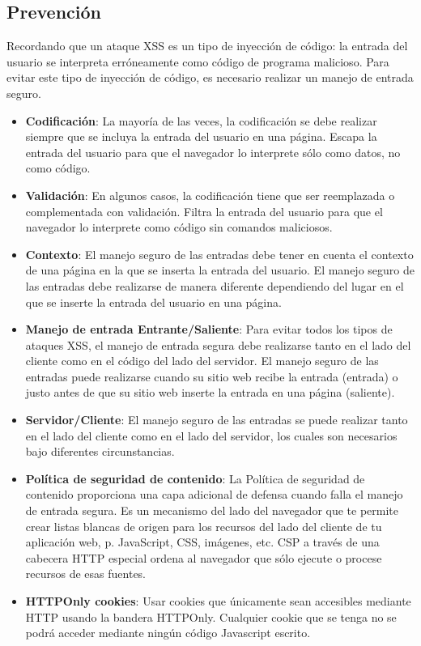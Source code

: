 \subsection{Prevención}

Recordando que un ataque XSS es un tipo de inyección de código: la entrada del usuario se interpreta erróneamente como código de programa malicioso. Para evitar este tipo de inyección de código, es necesario realizar un manejo de entrada seguro. \\

\begin{itemize}
    \item \textbf{Codificación}: La mayoría de las veces, la codificación se debe realizar siempre que se incluya la entrada del usuario en una página. Escapa la entrada del usuario para que el navegador lo interprete sólo como datos, no como código.
    \item \textbf{Validación}: En algunos casos, la codificación tiene que ser reemplazada o complementada con validación. Filtra la entrada del usuario para que el navegador lo interprete como código sin comandos maliciosos.
    \item \textbf{Contexto}: El manejo seguro de las entradas debe tener en cuenta el contexto de una página en la que se inserta la entrada del usuario. El manejo seguro de las entradas debe realizarse de manera diferente dependiendo del lugar en el que se inserte la entrada del usuario en una página.
    \item \textbf{Manejo de entrada Entrante/Saliente}: Para evitar todos los tipos de ataques XSS, el manejo de entrada segura debe realizarse tanto en el lado del cliente como en el código del lado del servidor. El manejo seguro de las entradas puede realizarse cuando su sitio web recibe la entrada (entrada) o justo antes de que su sitio web inserte la entrada en una página (saliente).
    \item \textbf{Servidor/Cliente}: El manejo seguro de las entradas se puede realizar tanto en el lado del cliente como en el lado del servidor, los cuales son necesarios bajo diferentes circunstancias.
    \item \textbf{Política de seguridad de contenido}: La Política de seguridad de contenido proporciona una capa adicional de defensa cuando falla el manejo de entrada segura. Es un mecanismo del lado del navegador que te permite crear listas blancas de origen para los recursos del lado del cliente de tu aplicación web, p. JavaScript, CSS, imágenes, etc. CSP a través de una cabecera HTTP especial ordena al navegador que sólo ejecute o procese recursos de esas fuentes.
    \item \textbf{HTTPOnly cookies}: Usar cookies que únicamente sean accesibles mediante HTTP usando la bandera HTTPOnly. Cualquier cookie que se tenga no se podrá acceder mediante ningún código Javascript escrito.
\end{itemize}

